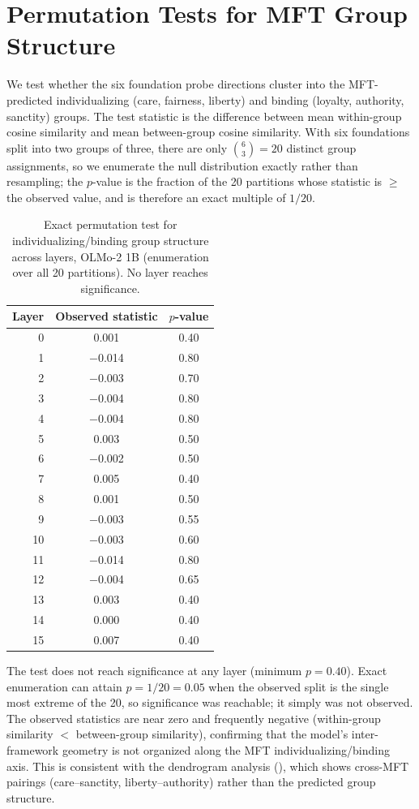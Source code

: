 \section{Permutation Tests for MFT Group Structure}\label{permutation-tests-for-mft-group-structure}

\label{app:permutation}

We test whether the six foundation probe directions cluster into the
MFT-predicted individualizing (care, fairness, liberty) and binding
(loyalty, authority, sanctity) groups. The test statistic is the
difference between mean within-group cosine similarity and mean
between-group cosine similarity. With six foundations split into two
groups of three, there are only \(\binom{6}{3} = 20\) distinct group
assignments, so we enumerate the null distribution exactly rather than
resampling; the \(p\)-value is the fraction of the 20 partitions whose
statistic is \(\geq\) the observed value, and is therefore an exact
multiple of \(1/20\).

\begin{table}[h]
\centering
\caption{Exact permutation test for individualizing/binding group structure across layers, OLMo-2 1B (enumeration over all 20 partitions). No layer reaches significance.}
\label{tab:permutation}
\small
\begin{tabular}{r cc}
\toprule
Layer & Observed statistic & $p$-value \\
\midrule
0  &  0.001 & 0.40 \\
1  & $-$0.014 & 0.80 \\
2  & $-$0.003 & 0.70 \\
3  & $-$0.004 & 0.80 \\
4  & $-$0.004 & 0.80 \\
5  &  0.003 & 0.50 \\
6  & $-$0.002 & 0.50 \\
7  &  0.005 & 0.40 \\
8  &  0.001 & 0.50 \\
9  & $-$0.003 & 0.55 \\
10 & $-$0.003 & 0.60 \\
11 & $-$0.014 & 0.80 \\
12 & $-$0.004 & 0.65 \\
13 &  0.003 & 0.40 \\
14 &  0.000 & 0.40 \\
15 &  0.007 & 0.40 \\
\bottomrule
\end{tabular}
\end{table}

The test does not reach significance at any layer (minimum \(p = 0.40\)).
Exact enumeration can attain \(p = 1/20 = 0.05\) when the observed split
is the single most extreme of the 20, so significance was reachable;
it simply was not observed. The observed statistics are near zero and frequently
negative (within-group similarity \(<\) between-group similarity),
confirming that the model's inter-framework geometry is not
organized along the MFT individualizing/binding axis. This is
consistent with the dendrogram analysis (), which shows
cross-MFT pairings (care--sanctity, liberty--authority) rather
than the predicted group structure.
